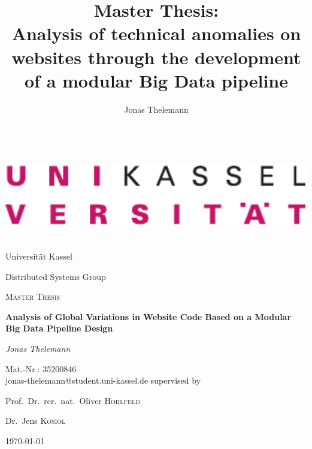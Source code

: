\documentclass[a4paper, 11pt, twoside]{article}
\title{Master Thesis:\\Analysis of technical anomalies on websites through the development of a modular Big Data pipeline}
\author{Jonas Thelemann}
\begin{document}
\renewcommand\thesubrqcounter{\arabic{rqcounter}.\arabic{subrqcounter}}
\makeatletter
\newcommand{\iflabelexists}[3]{\@ifundefined{myr@#1}{#2}{#3}}
\makeatother
\newcommand\Question[2]{
\def\labelorref{\iflabelexists{#1}{\refstepcounter{rqcounter}\setcounter{subrqcounter}{0}\arabic{rqcounter}\label{#1}\expandafter\xdef\csname myr@#1\endcsname{}}{\ref{#1}}}
  \noindent\textbf{RQ\labelorref: #2}
}
\newcommand\subQuestion[2]{
\def\labelorref{\iflabelexists{#1}{\refstepcounter{subrqcounter}\arabic{rqcounter}.\arabic{subrqcounter}\label{#1}\expandafter\xdef\csname myr@#1\endcsname{}}{\ref{#1}}}
  \noindent\textbf{RQ\labelorref: #2}
}

\begin{titlepage}
    \centering
    \includegraphics[width=0.4\linewidth, height=4cm,keepaspectratio=true]{./figures/uk-logo.pdf}\par\vspace{1cm}
    {\LARGE Universität Kassel\par}
    \vspace{0.5cm}
    {\Large Distributed Systems Group\par}
    \vspace{4cm}
    {\scshape\Large Master Thesis\par}
    \vspace{1.5cm}
    {\huge\bfseries Analysis of Global Variations in Website Code Based on a Modular Big Data Pipeline Design\par}
    \vspace{2cm}
    {\Large\itshape Jonas Thelemann\par}
    \vspace{0.5cm}
    {\large Mat.-Nr.: 35200846\\jonas-thelemann@student.uni-kassel.de}
    \vfill
    supervised by\par
    Prof.~Dr.~rer.~nat.~Oliver \textsc{Hohlfeld}\par
    Dr.~Jens \textsc{Kosiol}

    \vfill

    {\large \today\par}
\end{titlepage}
\end{document}
